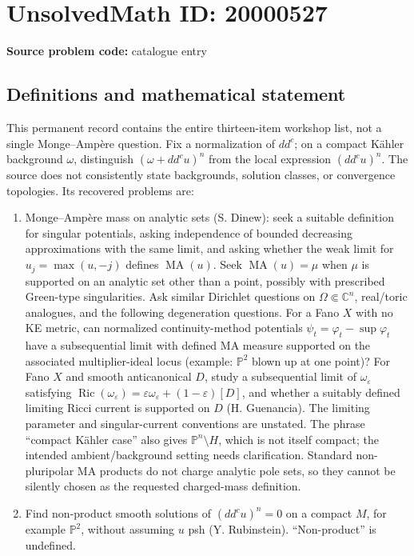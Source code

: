 \documentclass[11pt]{article}
\newcommand{\C}{\mathbb{C}}
\newcommand{\PP}{\mathbb{P}}
\begin{document}
\section*{UnsolvedMath ID: 20000527}
\textbf{Source problem code:} catalogue entry
\subsection{Definitions and mathematical statement}
This permanent record contains the entire thirteen-item workshop list, not a single Monge--Amp\`ere question. Fix a normalization of \(dd^c\); on a compact K\"ahler background \(\omega\), distinguish \((\omega+dd^cu)^n\) from the local expression \((dd^cu)^n\). The source does not consistently state backgrounds, solution classes, or convergence topologies. Its recovered problems are:
\begin{enumerate}
\item Monge--Amp\`ere mass on analytic sets (S. Dinew): seek a suitable definition for singular potentials, asking independence of bounded decreasing approximations with the same limit, and asking whether the weak limit for \(u_j=\max(u,-j)\) defines \(\operatorname{MA}(u)\). Seek \(\operatorname{MA}(u)=\mu\) when \(\mu\) is supported on an analytic set other than a point, possibly with prescribed Green-type singularities. Ask similar Dirichlet questions on \(\Omega\Subset\C^n\), real/toric analogues, and the following degeneration questions. For a Fano \(X\) with no KE metric, can normalized continuity-method potentials \(\psi_t=\varphi_t-\sup\varphi_t\) have a subsequential limit with defined MA measure supported on the associated multiplier-ideal locus (example: \(\PP^2\) blown up at one point)? For Fano \(X\) and smooth anticanonical \(D\), study a subsequential limit of \(\omega_\varepsilon\) satisfying \(\operatorname{Ric}(\omega_\varepsilon)=\varepsilon\omega_\varepsilon+(1-\varepsilon)[D]\), and whether a suitably defined limiting Ricci current is supported on \(D\) (H. Guenancia). The limiting parameter and singular-current conventions are unstated. The phrase ``compact K\"ahler case'' also gives \(\PP^n\setminus H\), which is not itself compact; the intended ambient/background setting needs clarification. Standard non-pluripolar MA products do not charge analytic pole sets, so they cannot be silently chosen as the requested charged-mass definition.
\item Find non-product smooth solutions of \((dd^cu)^n=0\) on a compact \(M\), for example \(\PP^2\), without assuming \(u\) psh (Y. Rubinstein). ``Non-product'' is undefined.

\end{enumerate}
\end{document}
